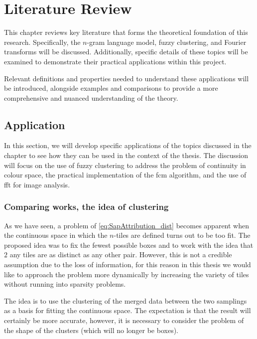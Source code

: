 \chapter{Literature Review}
\label{chap:LiteratureReview}
\begin{toReview}
This chapter reviews key literature that forms the theoretical foundation of this research. Specifically, the $n$-gram language model, fuzzy clustering, and Fourier transforms will be discussed. Additionally, specific details of these topics will be examined to demonstrate their practical applications within this project.

\noindent Relevant definitions and properties needed to understand these applications will be introduced, alongside examples and comparisons to provide a more comprehensive and nuanced understanding of the theory.




\section{Application}
In this section, we will develop specific applications of the topics discussed in the chapter to see how they can be used in the context of the thesis. The discussion will focus on the use of fuzzy clustering to address the problem of continuity in colour space, the practical implementation of the \gls{fcm} algorithm, and the use of \gls{fft} for image analysis.
\subsection{Comparing works, the idea of clustering}
As we have seen, a problem of \cref{eq:SapAttribution_dist} becomes apparent when the continuous space in which the $n$-tiles are defined turns out to be too fit. The proposed idea was to fix the fewest possible boxes and to work with the idea that $2$ any tiles are as distinct as any other pair. However, this is not a credible assumption due to the loss of information, for this reason in this thesis we would like to approach the problem more dynamically by increasing the variety of tiles without running into sparsity problems.

\noindent The idea is to use the clustering of the merged data between the two samplings as a basis for fitting the continuous space. The expectation is that the result will certainly be more accurate, however, it is necessary to consider the problem of the shape of the clusters (which will no longer be boxes).


\end{toReview}
